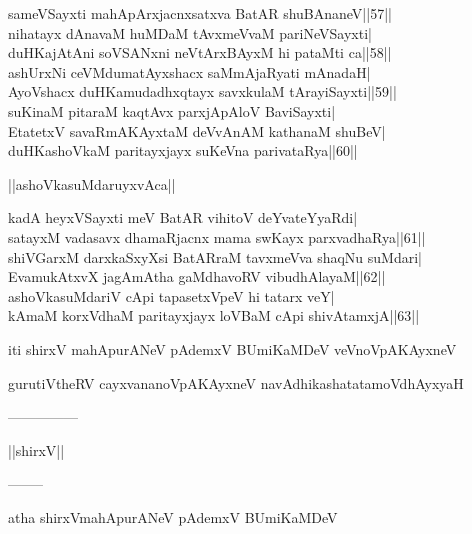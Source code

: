 \documentclass{article}
\begin{document}
sameVSayxti mahApArxjacnxsatxva BatAR shuBAnaneV||57||\\
nihatayx dAnavaM huMDaM tAvxmeVvaM pariNeVSayxti|\\
duHKajAtAni soVSANxni neVtArxBAyxM hi pataMti ca||58||\\
ashUrxNi ceVMdumatAyxshacx saMmAjaRyati mAnadaH|\\
AyoVshacx duHKamudadhxqtayx savxkulaM tArayiSayxti||59||\\
suKinaM pitaraM kaqtAvx parxjApAloV BaviSayxti|\\
EtatetxV savaRmAKAyxtaM deVvAnAM kathanaM shuBeV|\\
duHKashoVkaM paritayxjayx suKeVna parivataRya||60||\\

\begin{center}
||ashoVkasuMdaruyxvAca||
\end{center}

kadA heyxVSayxti meV BatAR vihitoV deYvateYyaRdi|\\
satayxM vadasavx dhamaRjacnx mama swKayx parxvadhaRya||61||\\
shiVGarxM darxkaSxyXsi BatARraM tavxmeVva shaqNu suMdari|\\
EvamukAtxvX jagAmAtha gaMdhavoRV vibudhAlayaM||62||\\
ashoVkasuMdariV cApi tapasetxVpeV hi tatarx veY|\\
kAmaM korxVdhaM paritayxjayx loVBaM cApi shivAtamxjA||63||

\begin{center}
iti shirxV mahApurANeV pAdemxV BUmiKaMDeV veVnoVpAKAyxneV
\end{center}

\begin{center}
gurutiVtheRV cayxvananoVpAKAyxneV navAdhikashatatamoVdhAyxyaH
\end{center}

\begin{center}
---------------
\end{center}

\begin{center}
||shirxV||
\end{center}

\begin{center}
--------
\end{center}

\begin{center}
atha shirxVmahApurANeV pAdemxV BUmiKaMDeV
\end{center}
\end{document}
